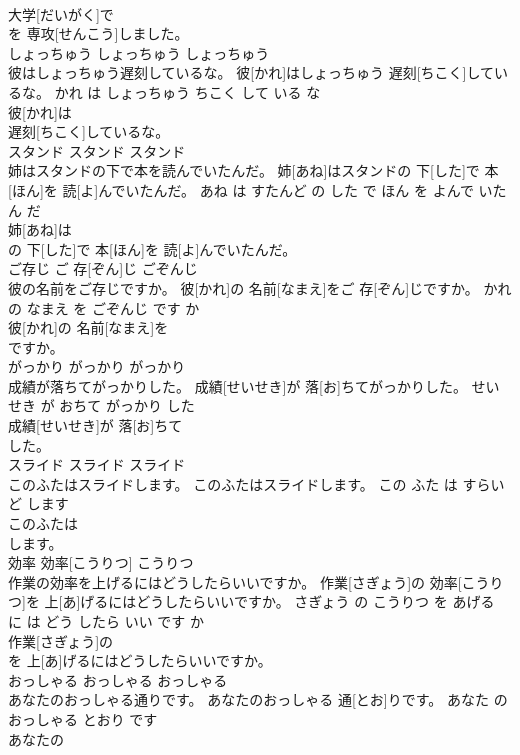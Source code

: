 \documentclass[8pt]{extreport}
\begin{document}
\begin{CJK}{UTF8}{min}
\\	大学[だいがく]で
\\	を 専攻[せんこう]しました。			
\\	しょっちゅう	しょっちゅう	しょっちゅう	
\\	彼はしょっちゅう遅刻しているな。	彼[かれ]はしょっちゅう 遅刻[ちこく]しているな。	かれ は しょっちゅう ちこく して いる な	
\\	彼[かれ]は
\\	遅刻[ちこく]しているな。			
\\	スタンド	スタンド	スタンド	
\\	姉はスタンドの下で本を読んでいたんだ。	姉[あね]はスタンドの 下[した]で 本[ほん]を 読[よ]んでいたんだ。	あね は すたんど の した で ほん を よんで いた ん だ	
\\	姉[あね]は
\\	の 下[した]で 本[ほん]を 読[よ]んでいたんだ。			
\\	ご存じ	ご 存[ぞん]じ	ごぞんじ	
\\	彼の名前をご存じですか。	彼[かれ]の 名前[なまえ]をご 存[ぞん]じですか。	かれ の なまえ を ごぞんじ です か	
\\	彼[かれ]の 名前[なまえ]を
\\	ですか。			
\\	がっかり	がっかり	がっかり	
\\	成績が落ちてがっかりした。	成績[せいせき]が 落[お]ちてがっかりした。	せいせき が おちて がっかり した	
\\	成績[せいせき]が 落[お]ちて
\\	した。			
\\	スライド	スライド	スライド	
\\	このふたはスライドします。	このふたはスライドします。	この ふた は すらいど します	
\\	このふたは
\\	します。			
\\	効率	効率[こうりつ]	こうりつ	
\\	作業の効率を上げるにはどうしたらいいですか。	作業[さぎょう]の 効率[こうりつ]を 上[あ]げるにはどうしたらいいですか。	さぎょう の こうりつ を あげる に は どう したら いい です か	
\\	作業[さぎょう]の
\\	を 上[あ]げるにはどうしたらいいですか。			
\\	おっしゃる	おっしゃる	おっしゃる	
\\	あなたのおっしゃる通りです。	あなたのおっしゃる 通[とお]りです。	あなた の おっしゃる とおり です	
\\	あなたの

\end{CJK}
\end{document}

